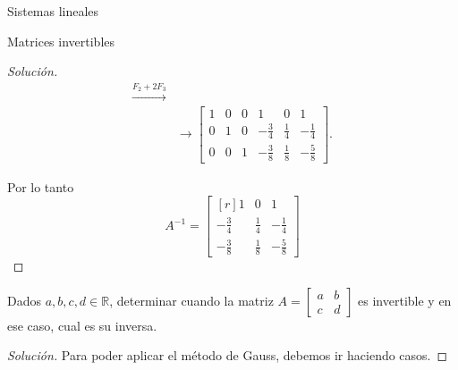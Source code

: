 \begin{chapter}{Sistemas lineales}
\begin{section}{Matrices invertibles}
\begin{proof}[Solución]
\begin{align*}
                \stackrel{F_2+2F_3}{\longrightarrow} \\
                &\longrightarrow
                \left[\begin{array}{rrr|rrr}	1&0&0&1&0&1\\ 0&1&0&-\frac34&\frac14&-\frac14 \\ 0&0&1&-\frac38&\frac18&-\frac58 \end{array}\right].
                \end{align*}
                
                Por lo tanto 
                \begin{equation*}
                A^{-1} = 	\begin{bmatrix*}[r]	1&0&1\\ -\frac34&\frac14&-\frac14 \\ -\frac38&\frac18&-\frac58 \end{bmatrix*}
                \end{equation*}
            \end{proof}
            
            \begin{ejemplo*}\label{inv-2x2-0}
                Dados $a,b,c,d \in \mathbb R$, determinar cuando la matriz $A = \begin{bmatrix*} a&b\\c&d\end{bmatrix*}$  es invertible y en ese caso,  cual es su inversa. 
            \end{ejemplo*}
            \begin{proof}[Solución] Para poder aplicar el método de Gauss, debemos ir haciendo casos. 
                

\end{proof}
\end{section}
\end{chapter}
